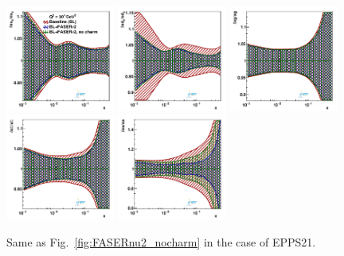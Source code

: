 \begin{figure}[t]
\centering
\includegraphics[width=0.32\textwidth]{plots/nuclear_fasernu2/inclusive-only_vs_inclusive+charm/statOnly_FASERv2_q2_10000_pdf_uv_ratio.pdf}
\includegraphics[width=0.32\textwidth]{plots/nuclear_fasernu2/inclusive-only_vs_inclusive+charm/statOnly_FASERv2_q2_10000_pdf_dv_ratio.pdf}
\includegraphics[width=0.32\textwidth]{plots/nuclear_fasernu2/inclusive-only_vs_inclusive+charm/statOnly_FASERv2_q2_10000_pdf_g_ratio.pdf}\\
\includegraphics[width=0.32\textwidth]{plots/nuclear_fasernu2/inclusive-only_vs_inclusive+charm/statOnly_FASERv2_q2_10000_pdf_Sea_ratio.pdf}
\includegraphics[width=0.32\textwidth]{plots/nuclear_fasernu2/inclusive-only_vs_inclusive+charm/statOnly_FASERv2_q2_10000_pdf_s_ratio.pdf}
\caption{Same as Fig.~\ref{fig:FASERnu2_nocharm} in the case of EPPS21.
}
\label{fig:EPPS21_nocharm}
\end{figure}

